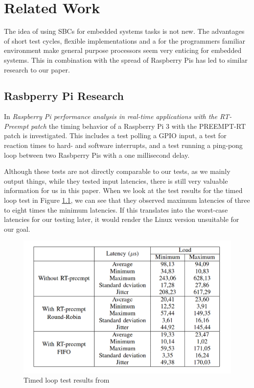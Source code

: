 \chapter{Related Work}
\label{chap:related_work}

The idea of using SBCs for embedded systems tasks is not new.
The advantages of short test cycles, flexible implementations and a for the programmers familiar environment make general purpose processors seem very enticing for embedded systems.
This in combination with the spread of Raspberry Pis has led to similar research to our paper.

\section{Rasbperry Pi Research}

In \textit{Raspberry Pi performance analysis in real-time applications with the RT-Preempt patch} \cite{Rasp3}
the timing behavior of a Raspberry Pi 3 with the PREEMPT-RT patch is investigated.
This includes a test polling a GPIO input,
a test for reaction times to hard- and software interrupts,
and a test running a ping-pong loop between two Rasbperry Pis with a one millisecond delay.

Although these tests are not directly comparable to our tests, as we mainly output things, while they tested input latencies, there is still very valuable information for us in this paper.
When we look at the test results for the timed loop test in Figure \ref{fig:rasp3}, we can see that they observed maximum latencies of three to eight times the minimum latencies.
If this translates into the worst-case latencies for our testing later, it would render the Linux version unsuitable for our goal.

\begin{figure}
  \begin{center}
    \includegraphics[width=.8\textwidth]{assets/Rasp3.png}
    \caption{Timed loop test results from \cite{Rasp3}}
    \label{fig:rasp3}
  \end{center}
\end{figure}

